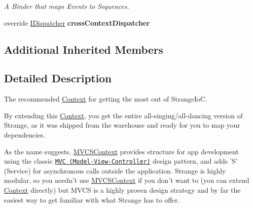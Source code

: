 \begin{DoxyCompactItemize}
\begin{DoxyCompactList}\small\item\em A Binder that maps Events to Sequences. \end{DoxyCompactList}\item 
\hypertarget{classstrange_1_1extensions_1_1context_1_1impl_1_1_m_v_c_s_context_a149995ccefc2f46a2e7784d3c78cb119}{override \hyperlink{interfacestrange_1_1extensions_1_1dispatcher_1_1api_1_1_i_dispatcher}{I\-Dispatcher} {\bfseries cross\-Context\-Dispatcher}}\label{classstrange_1_1extensions_1_1context_1_1impl_1_1_m_v_c_s_context_a149995ccefc2f46a2e7784d3c78cb119}

\end{DoxyCompactItemize}
\subsection*{Additional Inherited Members}


\subsection{Detailed Description}
The recommended \hyperlink{classstrange_1_1extensions_1_1context_1_1impl_1_1_context}{Context} for getting the most out of Strange\-Io\-C. 

By extending this \hyperlink{classstrange_1_1extensions_1_1context_1_1impl_1_1_context}{Context}, you get the entire all-\/singing/all-\/dancing version of Strange, as it was shipped from the warehouse and ready for you to map your dependencies.

As the name suggests, \hyperlink{classstrange_1_1extensions_1_1context_1_1impl_1_1_m_v_c_s_context}{M\-V\-C\-S\-Context} provides structure for app development using the classic \href{http://en.wikipedia.org/wiki/Model%E2%80%93view%E2%80%93controller}{\tt M\-V\-C (Model-\/\-View-\/\-Controller)} design pattern, and adds 'S' (Service) for asynchronous calls outside the application. Strange is highly modular, so you needn't use \hyperlink{classstrange_1_1extensions_1_1context_1_1impl_1_1_m_v_c_s_context}{M\-V\-C\-S\-Context} if you don't want to (you can extend \hyperlink{classstrange_1_1extensions_1_1context_1_1impl_1_1_context}{Context} directly) but M\-V\-C\-S is a highly proven design strategy and by far the easiest way to get familiar with what Strange has to offer.

